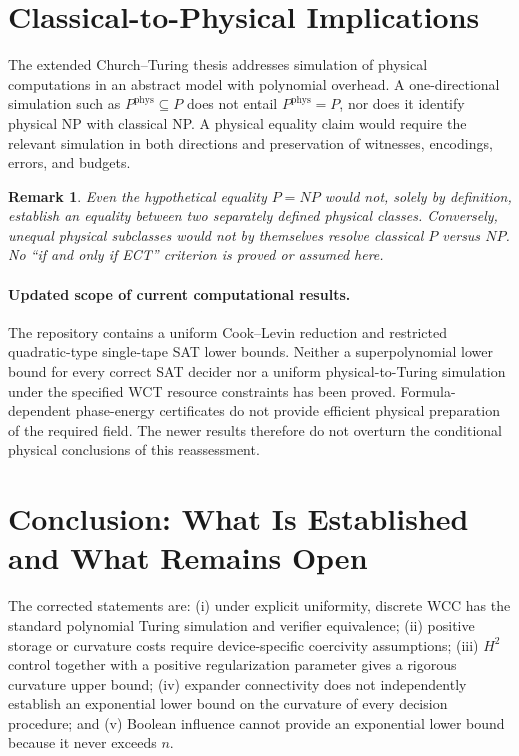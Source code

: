 \documentclass[11pt,a4paper]{article}
\newtheorem{remark}[theorem]{Remark}
\begin{document}
\section{Classical-to-Physical Implications}
\label{sec:ECT}
The extended Church--Turing thesis addresses simulation of physical
computations in an abstract model with polynomial overhead. A
one-directional simulation such as
$P^{\mathrm{phys}}\subseteq P$ does not entail
$P^{\mathrm{phys}}=P$, nor does it identify physical NP with classical NP.
A physical equality claim would require the relevant simulation in both
directions and preservation of witnesses, encodings, errors, and budgets.

\begin{remark}
Even the hypothetical equality $P=NP$ would not, solely by definition,
establish an equality between two separately defined physical classes.
Conversely, unequal physical subclasses would not by themselves resolve
classical $P$ versus $NP$. No ``if and only if ECT'' criterion is proved
or assumed here.
\end{remark}

\paragraph{Updated scope of current computational results.}
The repository contains a uniform Cook--Levin
reduction and restricted quadratic-type single-tape
SAT lower bounds.  Neither a superpolynomial lower
bound for every correct SAT decider nor a
uniform physical-to-Turing simulation under the
specified WCT resource constraints has been proved.
Formula-dependent phase-energy certificates do
not provide efficient physical preparation of the
required field.  The newer results therefore do
not overturn the conditional physical conclusions
of this reassessment.

\section{Conclusion: What Is Established and What Remains Open}
\label{sec:conclusion}
The corrected statements are: (i) under explicit uniformity, discrete WCC
has the standard polynomial Turing simulation and verifier equivalence;
(ii) positive storage or curvature costs require device-specific coercivity
assumptions; (iii) $H^2$ control together with a positive regularization
parameter gives a rigorous curvature upper bound; (iv) expander
connectivity does not independently establish an exponential lower bound
on the curvature of every decision procedure; and (v) Boolean influence
cannot provide an exponential lower bound because it never exceeds $n$.
\end{document}
